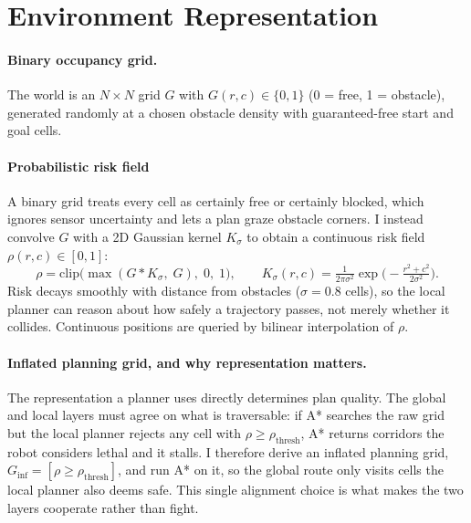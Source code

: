 \section{Environment Representation}

\paragraph{Binary occupancy grid.} The world is an $N\times N$ grid $G$ with
$G(r,c)\in\{0,1\}$ (0 = free, 1 = obstacle), generated randomly at a chosen obstacle
density with guaranteed-free start and goal cells.

\paragraph{Probabilistic risk field} A binary grid treats every cell as
certainly free or certainly blocked, which ignores sensor uncertainty and lets a plan
graze obstacle corners. I instead convolve $G$ with a 2D Gaussian kernel $K_\sigma$ to
obtain a continuous risk field $\rho(r,c)\in[0,1]$:
\begin{equation}
    \rho = \mathrm{clip}\!\big(\max(G * K_\sigma,\; G),\; 0,\; 1\big),
    \qquad K_\sigma(r,c)=\tfrac{1}{2\pi\sigma^2}\exp\!\big(-\tfrac{r^2+c^2}{2\sigma^2}\big).
\end{equation}
Risk decays smoothly with distance from obstacles ($\sigma=0.8$ cells), so the local
planner can reason about how safely a trajectory passes, not merely whether it
collides. Continuous positions are queried by bilinear interpolation of $\rho$.

\paragraph{Inflated planning grid, and why representation matters.} The representation a
planner uses directly determines plan quality. The global and local layers must agree on
what is traversable: if A* searches the raw grid but the local planner rejects any cell
with $\rho\ge\rho_\text{thresh}$, A* returns corridors the robot considers lethal and it
stalls. I therefore derive an inflated planning grid, $G_\text{inf}=[\rho\ge
\rho_\text{thresh}]$, and run A* on it, so the global route only visits cells the local
planner also deems safe. This single alignment choice is what makes the two layers
cooperate rather than fight.
